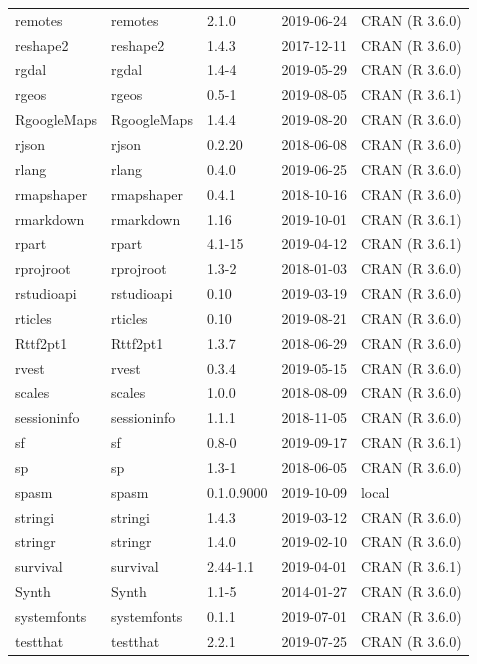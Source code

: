 \documentclass[]{article}
\begin{document}
\begin{longtable}[t]{lllll}
remotes & remotes & 2.1.0 & 2019-06-24 & CRAN (R 3.6.0)\\
\addlinespace
reshape2 & reshape2 & 1.4.3 & 2017-12-11 & CRAN (R 3.6.0)\\
rgdal & rgdal & 1.4-4 & 2019-05-29 & CRAN (R 3.6.0)\\
rgeos & rgeos & 0.5-1 & 2019-08-05 & CRAN (R 3.6.1)\\
RgoogleMaps & RgoogleMaps & 1.4.4 & 2019-08-20 & CRAN (R 3.6.0)\\
rjson & rjson & 0.2.20 & 2018-06-08 & CRAN (R 3.6.0)\\
\addlinespace
rlang & rlang & 0.4.0 & 2019-06-25 & CRAN (R 3.6.0)\\
rmapshaper & rmapshaper & 0.4.1 & 2018-10-16 & CRAN (R 3.6.0)\\
rmarkdown & rmarkdown & 1.16 & 2019-10-01 & CRAN (R 3.6.1)\\
rpart & rpart & 4.1-15 & 2019-04-12 & CRAN (R 3.6.1)\\
rprojroot & rprojroot & 1.3-2 & 2018-01-03 & CRAN (R 3.6.0)\\
\addlinespace
rstudioapi & rstudioapi & 0.10 & 2019-03-19 & CRAN (R 3.6.0)\\
rticles & rticles & 0.10 & 2019-08-21 & CRAN (R 3.6.0)\\
Rttf2pt1 & Rttf2pt1 & 1.3.7 & 2018-06-29 & CRAN (R 3.6.0)\\
rvest & rvest & 0.3.4 & 2019-05-15 & CRAN (R 3.6.0)\\
scales & scales & 1.0.0 & 2018-08-09 & CRAN (R 3.6.0)\\
\addlinespace
sessioninfo & sessioninfo & 1.1.1 & 2018-11-05 & CRAN (R 3.6.0)\\
sf & sf & 0.8-0 & 2019-09-17 & CRAN (R 3.6.1)\\
sp & sp & 1.3-1 & 2018-06-05 & CRAN (R 3.6.0)\\
spasm & spasm & 0.1.0.9000 & 2019-10-09 & local\\
stringi & stringi & 1.4.3 & 2019-03-12 & CRAN (R 3.6.0)\\
\addlinespace
stringr & stringr & 1.4.0 & 2019-02-10 & CRAN (R 3.6.0)\\
survival & survival & 2.44-1.1 & 2019-04-01 & CRAN (R 3.6.1)\\
Synth & Synth & 1.1-5 & 2014-01-27 & CRAN (R 3.6.0)\\
systemfonts & systemfonts & 0.1.1 & 2019-07-01 & CRAN (R 3.6.0)\\
testthat & testthat & 2.2.1 & 2019-07-25 & CRAN (R 3.6.0)\\

\end{longtable}
\end{document}
